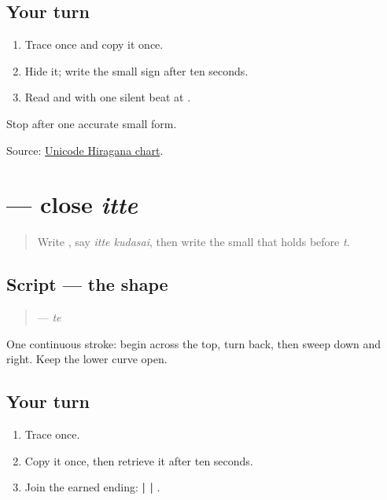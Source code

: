 \subsection*{Your turn}
\begin{enumerate}
\raggedright
  \item Trace \textbf{} once and copy it once.
  \item Hide it; write the small sign after ten seconds.
  \item Read \textbf{} and \textbf{} with one silent beat at \textbf{}.
\end{enumerate}

\begin{tcolorbox}[breakable,colback=teal!4,colframe=teal!35!black,title={Before you move on}]
Stop after one accurate small form.

Source: \href{https://www.unicode.org/charts/PDF/U3040.pdf}{Unicode Hiragana chart}.
\end{tcolorbox}
\section[\texorpdfstring{\ja{て} (te)}{て (te)}]{ — close \emph{itte}}

\label{lesson:JA-W11-te}



\begin{quote}
Write \textbf{}, say \emph{itte kudasai}, then write the small \textbf{} that holds before \emph{t}.
\end{quote}

\subsection*{Script — the shape}

\begin{quote}
\textbf{} — \emph{te}
\end{quote}

One continuous stroke: begin across the top, turn back, then sweep down and right. Keep the lower curve open.

\subsection*{Your turn}
\begin{enumerate}
\raggedright
  \item Trace \textbf{} once.
  \item Copy it once, then retrieve it after ten seconds.
  \item Join the earned ending: \textbf{ |  | }.
\end{enumerate}

